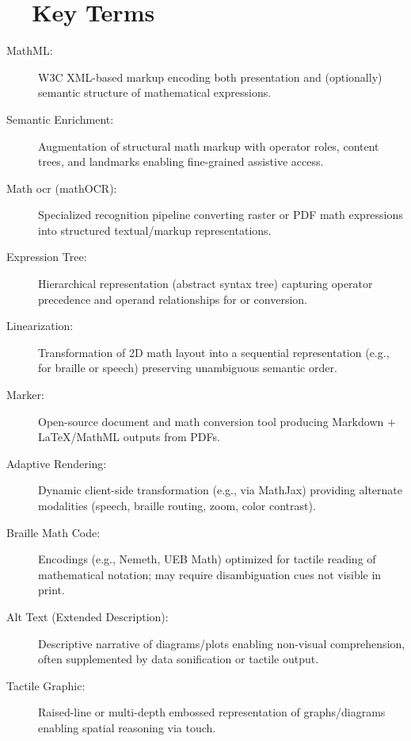 \section{~~Key Terms}\label{ch11:sec:key-terms}
\begin{description}
	\item[MathML:] W3C XML-based markup encoding both presentation and (optionally) semantic structure of mathematical expressions.\supercite{W3CMathML4}
	\item[Semantic Enrichment:] Augmentation of structural math markup with operator roles, content trees, and  landmarks enabling fine-grained assistive access.\supercite{IBMSemanticAI, OntotextSemanticAI}
	\item[Math \gls{ocr} (mathOCR):] Specialized recognition pipeline converting raster or PDF math expressions into structured textual/markup representations.\supercite{DeepLearningOCROverview}
	\item[Expression Tree:] Hierarchical representation (abstract syntax tree) capturing operator precedence and operand relationships for  or conversion.
	\item[Linearization:] Transformation of 2D math layout into a sequential representation (e.g., for braille or speech) preserving unambiguous semantic order.
	\item[Marker:] Open-source document and math conversion tool producing Markdown + LaTeX/MathML outputs from PDFs.\supercite{Marker, MarkerDocs}
	\item[Adaptive Rendering:] Dynamic client-side transformation (e.g., via MathJax) providing alternate modalities (speech, braille routing, zoom, color contrast).
	\item[Braille Math Code:] Encodings (e.g., Nemeth, UEB Math) optimized for tactile reading of mathematical notation; may require disambiguation cues not visible in print.
	\item[Alt Text (Extended Description):] Descriptive narrative of diagrams/plots enabling non-visual comprehension, often supplemented by data sonification or tactile output.
	\item[Tactile Graphic:] Raised-line or multi-depth embossed representation of graphs/diagrams enabling spatial reasoning via touch.
\end{description}

